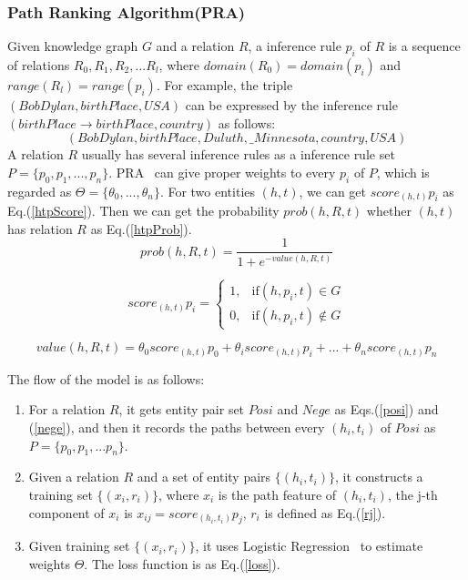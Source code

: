 \documentclass[runningheads]{llncs}
\begin{document}
\subsubsection{Path Ranking Algorithm(PRA)}
Given knowledge graph $G$ and a relation $R$, a inference rule $p_i$ of $R$ is a sequence of relations $R_0,R_1,R_2,...R_l$, where $domain(R_0) = domain(p_i)$ and $range(R_l)=range(p_i)$. For example, the triple $(Bob Dylan,birthPlace,USA)$ can be expressed by the inference rule $(birthPlace \rightarrow birthPlace,country)$ as follows:
$$(Bob Dylan,birthPlace,Duluth,\_Minnesota,country,USA)$$
A relation $R$ usually has several inference rules as a inference rule set $P=\{ p_0,p_1,...,p_n\}$.
PRA~\cite{lao2011random,lao2010fast} can give proper weights to every $p_i$ of $P$, which is regarded as $\Theta = \{\theta_{0},...,\theta_{n }\}$. For two entities $(h,t)$, we can get $score_{(h,t)}p_i$ as Eq.(\ref{htpScore}). Then we can get the probability $prob(h,R,t)$ whether $(h,t)$ has relation $R$ as Eq.(\ref{htpProb}).
\begin{equation}
  \label{htpProb}
prob(h,R,t) = \frac{1}{1+e^{-value(h,R,t)}}
\end{equation}

\begin{equation}\label{htpScore}
score_{(h,t)}p_i =
\left
  \{
	\begin{array}{ll}
	  1, & \text{if} (h,p_i,t) \in G \\
	  0, & \text{if} (h,p_i,t) \notin G
	\end{array}
\right.
\end{equation}

\begin{equation}
  \label{htp_prob}
value(h,R,t) = \theta_{0}score_{(h,t)}p_0 + \theta_{i}score_{(h,t)}p_i +...+\theta_{n}score_{(h,t)}p_n
\end{equation}

The flow of the model is as follows:
\begin{enumerate}
  \item For a relation $R$, it gets entity pair set $Posi$ and $Nege$ as Eqs.(\ref{posi}) and (\ref{nege}), and then it records the paths between every $(h_i,t_i)$ of $Posi$ as $P = \{ p_0,p_1,...p_n\}$.
  \item Given a relation $R$ and a set of entity pairs $\{(h_i,t_i)\}$, it constructs a training set $\{(x_i,r_i)\}$, where $x_i$ is the path feature of $(h_i,t_i)$, the j-th component of $x_i$ is $x_{ij}=score_{(h_i,t_i)}p_j$, $r_i$ is defined as Eq.(\ref{rj}).
  \item Given training set $\{(x_i,r_i)\}$, it uses Logistic Regression~\cite{hosmer2013applied} to estimate weights $\Theta$. The loss function is as Eq.(\ref{loss}).
\end{enumerate}
\end{document}
